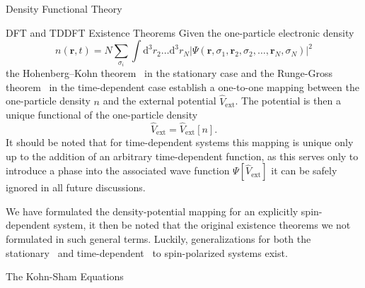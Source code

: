 \documentclass[letterpaper, 11 pt]{report}
\begin{document}
\begin{chapter}{Density Functional Theory \label{chap:dft}}
\begin{section}{DFT and TDDFT Existence Theorems \label{sec:dft}}
      Given the one-particle electronic density
      \begin{equation} \label{eq:dendef1}
         n(\mathbf{r}, t) = N \sum\limits_{\sigma_i} \int \mathrm{d}^3 r_2 \dots \mathrm{d}^3 r_N
                            \left| \Psi(\mathbf{r}, \sigma_1, \mathbf{r}_2, \sigma_2, \dots,
                                   \mathbf{r}_N, \sigma_N) \right|^2
      \end{equation}
      the Hohenberg–Kohn theorem~\cite{hk-theorem} in the stationary case and the Runge-Gross
      theorem~\cite{rgt} in the time-dependent case establish a one-to-one mapping between the
      one-particle density $n$ and the external potential $\hat{V}_\mathrm{ext}$. The potential is
      then a unique functional of the one-particle density
      \begin{equation} \label{eq:vext-func}
         \hat{V}_\mathrm{ext} = \hat{V}_\mathrm{ext} [n].
      \end{equation}
      It should be noted that for time-dependent systems this mapping is unique only up to the addition
      of an arbitrary time-dependent function, as this serves only to introduce a phase into the
      associated wave function $\Psi[\hat{V}_\mathrm{ext}]$ it can be safely ignored in all future
      discussions.

      We have formulated the density-potential mapping for an explicitly spin-dependent system, it
      then be noted that the original existence theorems we not formulated in such general terms.
      Luckily, generalizations for both the stationary~\cite{spin-dep1, spin-dep2} and
      time-dependent~\cite{td-spindep} to spin-polarized systems exist.

   \end{section}

   \begin{section}{The Kohn-Sham Equations \label{sec:ks}}


\end{section}
\end{chapter}
\end{document}
